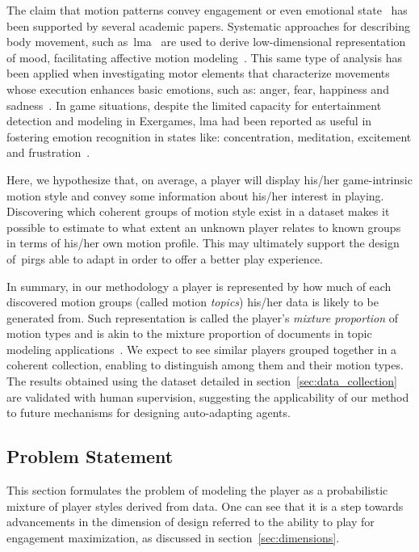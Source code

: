 The claim that motion patterns convey engagement or even emotional state~\citep{aristidou_emotion_2015,shafir_emotion_2016,tsachor_somatic_2017} has been supported by several academic papers. Systematic approaches for describing body movement, such as~\gls{lma}~\citep{laban_language_1974} are used to derive low-dimensional representation of mood, facilitating affective motion modeling~\citep{burton_laban_2016}. This same type of analysis has been applied when investigating motor elements that characterize movements whose execution enhances basic emotions, such as: anger, fear, happiness and sadness~\citep{shafir_emotion_2016}. In game situations, despite the limited capacity for entertainment detection and modeling in Exergames, \gls{lma} had been reported as useful in fostering emotion recognition in states like: concentration, meditation, excitement and frustration~\citep{zacharatos_emotion_2013}.

Here, we hypothesize that, on average, a player will display his/her game-intrinsic motion style and convey some information about his/her interest in playing. Discovering which coherent groups of motion style exist in a dataset makes it possible to estimate to what extent an unknown player relates to known groups in terms of his/her own motion profile. This may ultimately support the design of~\gls{pirg}s able to adapt in order to offer a better play experience.

In summary, in our methodology a player is represented by how much of each discovered motion groups (called motion \textit{topics}) his/her data is likely to be generated from. Such representation is called the player's \textit{mixture proportion} of motion types and is akin to the mixture proportion of documents in topic modeling applications~\citep{blei_latent_2003}. We expect to see similar players grouped together in a coherent collection, enabling to distinguish among them and their motion types. The results obtained using the dataset detailed in section~\ref{sec:data_collection} are validated with human supervision, suggesting the applicability of our method to future mechanisms for designing auto-adapting agents.

\subsection{Problem Statement}
This section formulates the problem of modeling the player as a probabilistic mixture of player styles derived from data. One can see that it is a step towards advancements in the dimension of design referred to the ability to play for engagement maximization, as discussed in section~\ref{sec:dimensions}.

